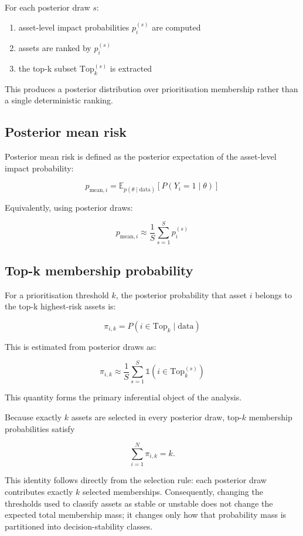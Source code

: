 \documentclass[
]{article}
\providecommand{\tightlist}{%
  \setlength{\itemsep}{0pt}\setlength{\parskip}{0pt}}
\begin{document}
For each posterior draw \(s\):

\begin{enumerate}
\def\labelenumi{\arabic{enumi}.}
\tightlist
\item
  asset-level impact probabilities \(p_i^{(s)}\) are computed
\item
  assets are ranked by \(p_i^{(s)}\)
\item
  the top-k subset \(\text{Top}_k^{(s)}\) is extracted
\end{enumerate}

This produces a posterior distribution over prioritisation membership
rather than a single deterministic ranking.

\subsection{Posterior mean risk}\label{posterior-mean-risk}

Posterior mean risk is defined as the posterior expectation of the
asset-level impact probability:

\[
p_{\text{mean}, i}
=
\mathbb{E}_{p(\theta \mid \text{data})}
\left[
P(Y_i = 1 \mid \theta)
\right]
\]

Equivalently, using posterior draws:

\[
p_{\text{mean}, i}
\approx
\frac{1}{S}
\sum_{s=1}^{S}
p_i^{(s)}
\]

\subsection{Top-k membership
probability}\label{top-k-membership-probability}

For a prioritisation threshold \(k\), the posterior probability that
asset \(i\) belongs to the top-k highest-risk assets is:

\[
\pi_{i,k}
=
P(i \in \text{Top}_k \mid \text{data})
\]

This is estimated from posterior draws as:

\[
\pi_{i,k}
\approx
\frac{1}{S}
\sum_{s=1}^{S}
\mathbb{1}
\left(
i \in \text{Top}_k^{(s)}
\right)
\]

This quantity forms the primary inferential object of the analysis.

Because exactly \(k\) assets are selected in every posterior draw,
top-\(k\) membership probabilities satisfy

\[
\sum_{i=1}^{N} \pi_{i,k} = k.
\]

This identity follows directly from the selection rule: each posterior
draw contributes exactly \(k\) selected memberships. Consequently,
changing the thresholds used to classify assets as stable or unstable
does not change the expected total membership mass; it changes only how
that probability mass is partitioned into decision-stability classes.
\end{document}

